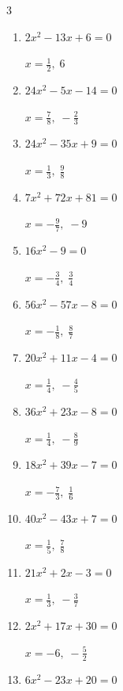 \begin{multicols}{3}
\begin{enumerate}
  \item $2x^{2}-13x+6=0$

        $\displaystyle x=\frac{1}{2},\; 6$

  \item $24x^{2}-5x-14=0$

        $\displaystyle x=\frac{7}{8},\; -\frac{2}{3}$

\columnbreak %

  \item $24x^{2}-35x+9=0$

        $\displaystyle x=\frac{1}{3},\; \frac{9}{8}$

  \item $7x^{2}+72x+81=0$

        $\displaystyle x=-\frac{9}{7},\; -9$

  \item $16x^{2}-9=0$

        $\displaystyle x=-\frac{3}{4},\; \frac{3}{4}$

  \item $56x^{2}-57x-8=0$

        $\displaystyle x=-\frac{1}{8},\; \frac{8}{7}$

  \item $20x^{2}+11x-4=0$

        $\displaystyle x=\frac{1}{4},\; -\frac{4}{5}$

  \item $36x^{2}+23x-8=0$

        $\displaystyle x=\frac{1}{4},\; -\frac{8}{9}$

  \item $18x^{2}+39x-7=0$

        $\displaystyle x=-\frac{7}{3},\; \frac{1}{6}$

  \item $40x^{2}-43x+7=0$

        $\displaystyle x=\frac{1}{5},\; \frac{7}{8}$

  \item $21x^{2}+2x-3=0$

        $\displaystyle x=\frac{1}{3},\; -\frac{3}{7}$

  \item $2x^{2}+17x+30=0$

        $\displaystyle x=-6,\; -\frac{5}{2}$

\columnbreak %

\resetques

  \item $6x^{2}-23x+20=0$


\end{enumerate}
\end{multicols}
